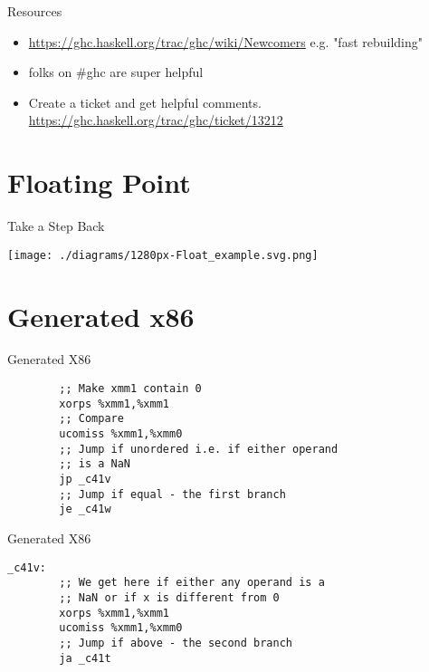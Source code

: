\documentclass[presentation]{beamer}
\begin{document}
\begin{frame}{Resources}
  \begin{itemize}
    \item
      \url{https://ghc.haskell.org/trac/ghc/wiki/Newcomers} e.g. "fast rebuilding"
    \item
      folks on \#ghc are super helpful
    \item
      Create a ticket and get helpful comments.
      \url{https://ghc.haskell.org/trac/ghc/ticket/13212}
    \end{itemize}
\end{frame}

\section{Floating Point}
\begin{frame}{Take a Step Back}
  \begin{center}
    \texttt{[image: ./diagrams/1280px-Float\_example.svg.png]}
  \end{center}
\end{frame}

\section{Generated x86}

\begin{frame}[fragile]{Generated X86}

\begin{lstlisting}
        ;; Make xmm1 contain 0
        xorps %xmm1,%xmm1
        ;; Compare
        ucomiss %xmm1,%xmm0
        ;; Jump if unordered i.e. if either operand
        ;; is a NaN
        jp _c41v
        ;; Jump if equal - the first branch
        je _c41w
\end{lstlisting}
\end{frame}

\begin{frame}[fragile]{Generated X86}

\begin{lstlisting}
_c41v:
        ;; We get here if either any operand is a
        ;; NaN or if x is different from 0
        xorps %xmm1,%xmm1
        ucomiss %xmm1,%xmm0
        ;; Jump if above - the second branch
        ja _c41t
\end{lstlisting}
\end{frame}
\end{document}
